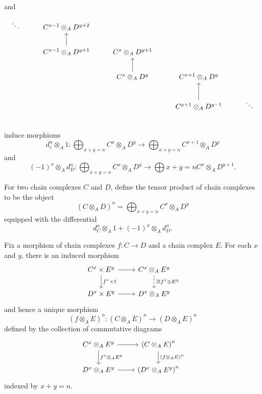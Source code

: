 \documentclass[dissertation.tex]{subfiles}
\begin{document}
and
$$\begin{tikzcd}
  \ddots
   & C^{x - 1} \otimes_A D^{y + 2}\\
  & C^{x - 1} \otimes_A D^{y + 1} \arrow{u}& C^x \otimes_A D^{y + 1}\\
  & & C^x \otimes_A D^y \arrow{u} & C^{x + 1} \otimes_A D^y\\
  & & & C^{x + 1} \otimes_A D^{y - 1}\arrow{u} & \ddots\\
\end{tikzcd}$$
induce morphisms
$$d^n_c \otimes_A 1 \colon \bigoplus_{x + y = n} C^x \otimes_A D^y \to \bigoplus_{x + y = n} C^{x+1} \otimes_A D^{y}$$
and
$$(-1)^x \otimes_A d^n_D \colon \bigoplus_{x + y = n} C^x \otimes_A D^y \to \bigoplus{x + y = n} C^{x} \otimes_A D^{y + 1}.$$
\begin{defn}
  For two chain complexes $C$ and $D$, define the tensor product of chain complexes to be the object
  $$\left(C \otimes_A D\right)^n = \bigoplus_{x + y = n}C^x \otimes_A D^y$$
  equipped with the differential
  $$d^n_C \otimes_A 1 + (-1)^x \otimes_A d^n_D.$$
\end{defn}

Fix a morphism of chain complexes $f \colon C \to D$ and a chain complex $E$.
For each $x$ and $y$, there is an induced morphism
$$\begin{tikzcd}
  C^x \times E^y \arrow{r}\arrow{d}{f^x \times 1} & C^x \otimes_A E^y \arrow[dashed]{d}{\exists ! f^x \otimes E^y}\\
  D^x \times E^y \arrow{r} & D^x \otimes_A E^y
\end{tikzcd}$$
and hence a unique morphism
$$\left(f \otimes_A E\right)^n \colon \left(C \otimes_A E\right)^n \to \left(D \otimes_A E\right)^n$$
defined by the collection of commutative diagrams
$$\begin{tikzcd}
  C^x \otimes_A E^y \arrow{r}\arrow{d}{f^x \otimes_A E^y} & \left(C \otimes_A E\right)^n \arrow{d}{(f \otimes_A E)^n}\\
  D^x \otimes_A E^y \arrow{r} & \left(D^x \otimes_A E^y\right)^n
\end{tikzcd}$$
indexed by $x + y = n$.
\end{document}

